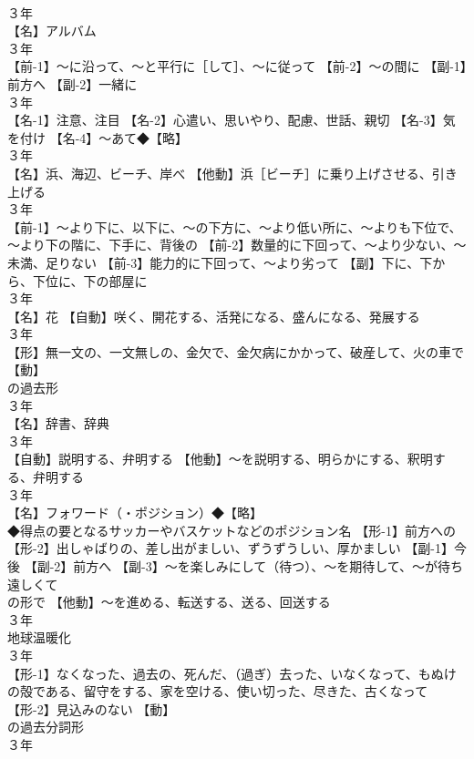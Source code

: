 \documentclass[8pt]{extreport}
\begin{document}
\begin{CJK}{UTF8}{min}
\\	３年	
\\	【名】アルバム
\\	３年	
\\	【前-1】～に沿って、～と平行に［して］、～に従って 【前-2】～の間に 【副-1】前方へ 【副-2】一緒に
\\	３年	
\\	【名-1】注意、注目 【名-2】心遣い、思いやり、配慮、世話、親切 【名-3】気を付け 【名-4】～あて◆【略】
\\	３年	
\\	【名】浜、海辺、ビーチ、岸べ 【他動】浜［ビーチ］に乗り上げさせる、引き上げる
\\	３年	
\\	【前-1】～より下に、以下に、～の下方に、～より低い所に、～よりも下位で、～より下の階に、下手に、背後の 【前-2】数量的に下回って、～より少ない、～未満、足りない 【前-3】能力的に下回って、～より劣って 【副】下に、下から、下位に、下の部屋に
\\	３年	
\\	【名】花 【自動】咲く、開花する、活発になる、盛んになる、発展する
\\	３年	
\\	【形】無一文の、一文無しの、金欠で、金欠病にかかって、破産して、火の車で 【動】
\\	の過去形
\\	３年	
\\	【名】辞書、辞典
\\	３年	
\\	【自動】説明する、弁明する 【他動】～を説明する、明らかにする、釈明する、弁明する
\\	３年	
\\	【名】フォワード（・ポジション）◆【略】
\\	◆得点の要となるサッカーやバスケットなどのポジション名 【形-1】前方への 【形-2】出しゃばりの、差し出がましい、ずうずうしい、厚かましい 【副-1】今後 【副-2】前方へ 【副-3】～を楽しみにして（待つ）、～を期待して、～が待ち遠しくて
\\	の形で 【他動】～を進める、転送する、送る、回送する
\\	３年	
\\	地球温暖化
\\	３年	
\\	【形-1】なくなった、過去の、死んだ、（過ぎ）去った、いなくなって、もぬけの殻である、留守をする、家を空ける、使い切った、尽きた、古くなって 【形-2】見込みのない 【動】
\\	の過去分詞形
\\	３年	

\end{CJK}
\end{document}
